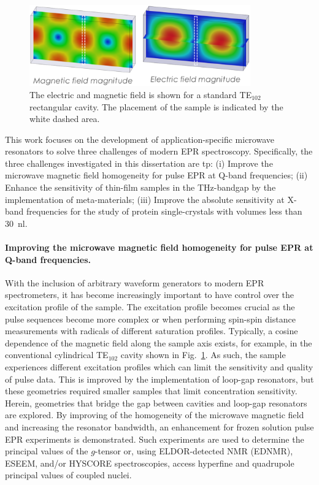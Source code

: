\begin{figure}[ht]
 \centering
 \includegraphics[width=0.85\textwidth]{Kapitel/Ch1-images/Cavity.eps}
 \caption[Standard TE$_{102}$ Caivty.]{The electric and magnetic field is shown for a standard TE$_{102}$ rectangular cavity. The placement of the sample is indicated by the white dashed area.}
 \label{fig:cavity}
\end{figure}

This work focuses on the development of application-specific microwave resonators to solve three challenges of modern EPR spectroscopy. Specifically, the three challenges investigated in this dissertation are tp: (i) Improve the microwave magnetic field homogeneity for pulse EPR at Q-band frequencies; (ii) Enhance the sensitivity of thin-film samples in the THz-bandgap by the implementation of meta-materials; (iii) Improve the absolute sensitivity at X-band frequencies for the study of protein single-crystals with volumes less than 30~nl.

\hspace{1em}
\noindent \paragraph*{Improving the microwave magnetic field homogeneity for pulse EPR at Q-band frequencies.}
With the inclusion of arbitrary waveform generators to modern EPR spectrometers, it has become increasingly important to have control over the excitation profile of the sample. \cite{DOLL201418,WILI201826} The excitation profile becomes crucial as the pulse sequences become more complex \cite{MILIKISYANTS200948,C7CP01488K,C6CP03067J,BREITGOFF2019106560} or when performing spin-spin distance measurements with radicals of different saturation profiles. \cite{C8CP01276H} Typically, a cosine dependence of the magnetic field along the sample axis exists, for example, in the conventional cylindrical TE$_{\text{102}}$ cavity shown in Fig.~\ref{fig:cavity}. As such, the sample experiences different excitation profiles which can limit the sensitivity and quality of pulse data. This is improved by the implementation of loop-gap resonators, but these geometries required smaller samples that limit concentration sensitivity. Herein, geometries that bridge the gap between cavities and loop-gap resonators are explored. By improving of the homogeneity of the microwave magnetic field\cite{HydeUFRev2019} and increasing the resonator bandwidth, an enhancement for frozen solution pulse EPR experiments is demonstrated. Such experiments are used to determine the principal values of the $g$-tensor or, using ELDOR-detected NMR (EDNMR), ESEEM, and/or HYSCORE spectroscopies, access hyperfine and quadrupole principal values of coupled nuclei. \cite{Harmer2009}

